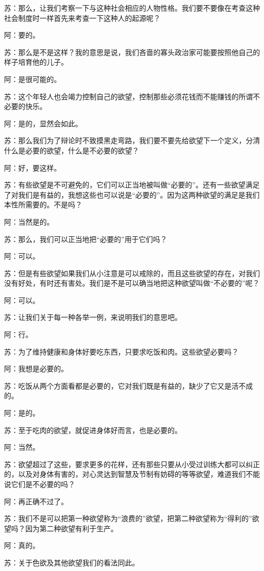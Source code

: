 \documentclass[12pt,oneside]{book}
\begin{document}
苏：那么，让我们考察一下与这种社会相应的人物性格。我们要不要像在考查这种社会制度时一样首先来考查一下这种人的起源呢？

阿：要的。

苏：那么是不是这样？我的意思是说，我们吝啬的寡头政治家可能要按照他自己的样子培育他的儿子。

阿：是很可能的。

苏：这个年轻人也会竭力控制自己的欲望，控制那些必须花钱而不能赚钱的所谓不必要的快乐。

阿：是的，显然会如此。

苏：那么我们为了辩论时不致摸黑走弯路，我们要不要先给欲望下一个定义，分清什么是必要的欲望，什么是不必要的欲望？

阿：好，要这样。

苏：有些欲望是不可避免的，它们可以正当地被叫做“必要的”。还有一些欲望满足了对我们是有益的，我想这些也可以说是“必要的”。因为这两种欲望的满足是我们本性所需要的。不是吗？

阿：当然是的。

苏：那么，我们可以正当地把“必要的”用于它们吗？

阿：可以。

苏：但是有些欲望如果我们从小注意是可以戒除的，而且这些欲望的存在，对我们没有好处，有时还有害处。我们是不是可以确当地把这种欲望叫做“不必要的”呢？

阿：可以。

苏：让我们关于每一种各举一例，来说明我们的意思吧。

阿：行。

苏：为了维持健康和身体好要吃东西，只要求吃饭和肉。这些欲望必要吗？

阿：我想是必要的。

苏：吃饭从两个方面看都是必要的，它对我们既是有益的，缺少了它又是活不成的。

阿：是的。

苏：至于吃肉的欲望，就促进身体好而言，也是必要的。

阿：当然。

苏：欲望超过了这些，要求更多的花样，还有那些只要从小受过训练大都可以纠正的，以及对身体有害的，对心灵达到智慧及节制有妨碍的等等欲望，难道我们不能说它们是不必要的吗？

阿：再正确不过了。

苏：我们不是可以把第一种欲望称为“浪费的”欲望，把第二种欲望称为“得利的”欲望吗？因为第二种欲望有利于生产。

阿：真的。

苏：关于色欲及其他欲望我们的看法同此。
\end{document}
